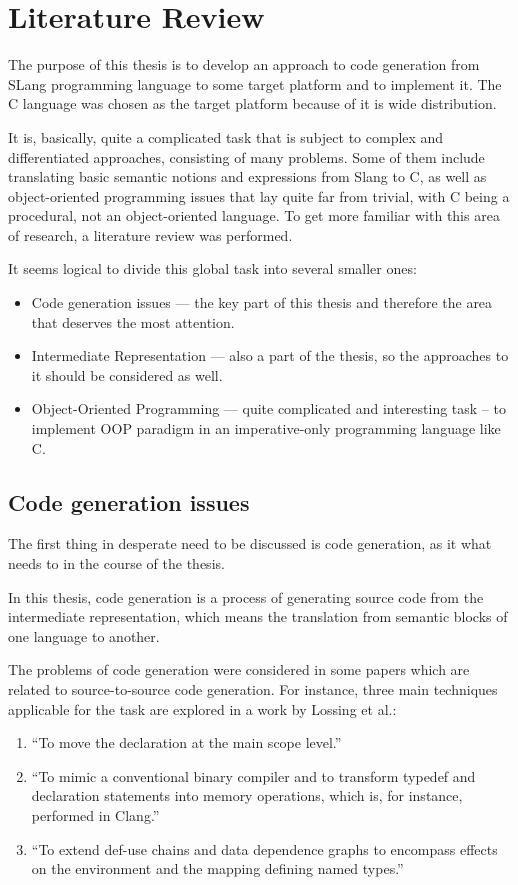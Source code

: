 \chapter{Literature Review}
\label{chap:lr}

The purpose of this thesis is to develop an approach to code generation from SLang programming language to some target platform and to implement it. The C language was chosen as the target platform because of it is wide distribution.

It is, basically, quite a complicated task that is subject to complex and differentiated approaches, consisting of many problems. Some of them include translating basic semantic notions and expressions from Slang to C, as well as object-oriented programming issues that lay quite far from trivial, with C being a procedural, not an object-oriented language. To get more familiar with this area of research, a literature review was performed.

It seems logical to divide this global task into several smaller ones:
\begin{itemize}
\item Code generation issues --- the key part of this thesis and therefore the area that deserves the most attention.
\item Intermediate Representation --- also a part of the thesis, so the approaches to it should be considered as well.
\item Object-Oriented Programming --- quite complicated and interesting task -- to implement OOP paradigm in an imperative-only programming language like C.
\end{itemize}

\section{Code generation issues}

The first thing in desperate need to be discussed is code generation, as it what needs to in the course of the thesis.

In this thesis, code generation is a process of generating source code from the intermediate representation, which means the translation from semantic blocks of one language to another.

The problems of code generation were considered in some papers which are related to source-to-source code generation. For instance, three main techniques applicable for the task are explored in a work by Lossing et al.\cite{Lossing2016}:
\begin{enumerate}
    \item ``To move the declaration at the main scope level.''
    \item ``To mimic a conventional binary compiler and to transform typedef and declaration  statements  into  memory  operations,  which  is,  for  instance, performed in Clang.''
    \item ``To extend def-use chains and data dependence graphs to encompass effects on the environment and the mapping defining named types.''
\end{enumerate}

